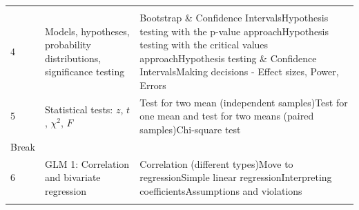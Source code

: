 \documentclass[]{book}
\begin{document}
\begin{longtable}[]{@{}lll@{}}
\begin{minipage}[t]{0.30\columnwidth}
\end{minipage}\tabularnewline
\begin{minipage}[t]{0.30\columnwidth}\raggedright
4\strut
\end{minipage} & \begin{minipage}[t]{0.30\columnwidth}\raggedright
Models, hypotheses, probability distributions, significance testing\strut
\end{minipage} & \begin{minipage}[t]{0.30\columnwidth}\raggedright
Bootstrap \& Confidence IntervalsHypothesis testing with the p-value approachHypothesis testing with the critical values approachHypothesis testing \& Confidence IntervalsMaking decisions - Effect sizes, Power, Errors\strut
\end{minipage}\tabularnewline
\begin{minipage}[t]{0.30\columnwidth}\raggedright
5\strut
\end{minipage} & \begin{minipage}[t]{0.30\columnwidth}\raggedright
Statistical tests: \(z\), \(t\), \(\chi^2\), \(F\)\strut
\end{minipage} & \begin{minipage}[t]{0.30\columnwidth}\raggedright
Test for two mean (independent samples)Test for one mean and test for two means (paired samples)Chi-square test\strut
\end{minipage}\tabularnewline
\begin{minipage}[t]{0.30\columnwidth}\raggedright
Break\strut
\end{minipage} & \begin{minipage}[t]{0.30\columnwidth}\raggedright
\strut
\end{minipage} & \begin{minipage}[t]{0.30\columnwidth}\raggedright
\strut
\end{minipage}\tabularnewline
\begin{minipage}[t]{0.30\columnwidth}\raggedright
6\strut
\end{minipage} & \begin{minipage}[t]{0.30\columnwidth}\raggedright
GLM 1: Correlation and bivariate regression\strut
\end{minipage} & \begin{minipage}[t]{0.30\columnwidth}\raggedright
Correlation (different types)Move to regressionSimple linear regressionInterpreting coefficientsAssumptions and violations\strut
\end{minipage}\tabularnewline
\begin{minipage}[t]{0.30\columnwidth}\raggedright

\end{minipage}
\end{longtable}
\end{document}
